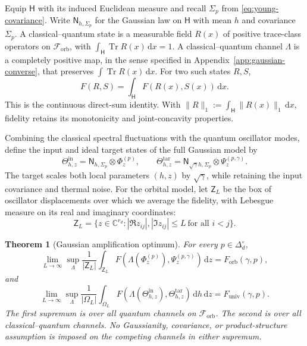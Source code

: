 \documentclass[11pt]{article}
\newtheorem{theorem}{Theorem}[section]
\theoremstyle{remark}
\theoremstyle{plain}
\newcommand{\C}{\mathbb C}
\newcommand{\cF}{\mathcal F}
\newcommand{\dd}{\mathrm d}
\newcommand{\Tr}{\operatorname{Tr}}
\newcommand{\ot}{\otimes}
\newcommand{\Forb}{F_{\mathrm{orb}}}
\newcommand{\Funiv}{F_{\mathrm{univ}}}
\begin{document}
Equip \(\mathsf H\) with its induced Euclidean measure and recall
\(\Sigma_p\) from \eqref{eq:young-covariance}.  Write
\(\mathsf N_{h,\Sigma_p}\) for the Gaussian law on \(\mathsf H\) with mean
\(h\) and covariance \(\Sigma_p\).  A classical--quantum state is a
measurable field \(R(x)\) of positive trace-class operators on
\(\cF_{\mathrm{orb}}\), with \(\int_{\mathsf H}\Tr R(x)\,\dd x=1\).
A classical--quantum channel \(\Lambda\) is a
completely positive map, in the sense specified in
Appendix~\ref{app:gaussian-converse}, that preserves
\(\int\Tr R(x)\,\dd x\).  For two such states \(R,S\),
\[
  F(R,S)=\int_{\mathsf H}F(R(x),S(x))\,\dd x.
\]
This is the continuous direct-sum identity.  With
\(\|R\|_1:=\int_{\mathsf H}\|R(x)\|_1\,\dd x\), fidelity retains its
monotonicity and joint-concavity properties.

Combining the classical spectral fluctuations with the quantum oscillator
modes, define the input and ideal target states of the full Gaussian model by
\begin{equation}\label{eq:full-gaussian-model}
  \Theta_{h,z}^{\mathrm{in}}
  =\mathsf N_{h,\Sigma_p}\ot\Phi_z^{(p)},
  \qquad
  \Theta_{h,z}^{\mathrm{tar}}
  =\mathsf N_{\sqrt\gamma h,\Sigma_p}\ot\Psi_z^{(p,\gamma)}.
\end{equation}
The target scales both local parameters \((h,z)\) by
\(\sqrt\gamma\), while retaining the input covariance and thermal noise.
For the orbital model, let \(\mathsf Z_L\) be the box of oscillator
displacements over which we average the fidelity, with Lebesgue measure
on its real and imaginary coordinates:
\[
  \mathsf Z_L
  =\{z\in\C^{r_d}:|\Re z_{ij}|,|\Im z_{ij}|\le L\ \text{for all }i<j\}.
\]

\begin{theorem}[Gaussian amplification optimum]
\label{thm:gaussian-amplification}
For every \(p\in\Delta_d^\circ\),
\begin{equation}\label{eq:gaussian-orbital-optimum}
  \lim_{L\to\infty}\sup_\Lambda
  \frac1{|\mathsf Z_L|}\int_{\mathsf Z_L}
  F\!\left(\Lambda(\Phi_z^{(p)}),\Psi_z^{(p,\gamma)}\right)\,\dd z
  =\Forb(\gamma,p),
\end{equation}
and
\begin{equation}\label{eq:gaussian-full-optimum}
  \lim_{L\to\infty}\sup_\Lambda
  \frac1{|\Omega_L|}\int_{\Omega_L}
  F\!\left(\Lambda(\Theta_{h,z}^{\mathrm{in}}),
            \Theta_{h,z}^{\mathrm{tar}}\right)\,\dd h\,\dd z
  =\Funiv(\gamma,p).
\end{equation}
The first supremum is over all quantum channels on
\(\cF_{\mathrm{orb}}\). The second is over all classical--quantum channels.
No Gaussianity, covariance, or product-structure assumption is imposed on
the competing channels in either supremum.
\end{theorem}
\end{document}
